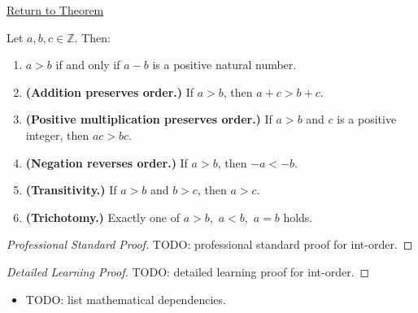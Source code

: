 \newpage
{}
\label{prf:int-order}

\begin{remark*}[Return]
\hyperref[lem:int-order]{Return to Theorem}
\end{remark*}

\begin{lemma*}
Let $a, b, c \in \mathbb{Z}$. Then:
\begin{enumerate}
  \item[(a)] $a > b$ if and only if $a - b$ is a positive natural number.
  \item[(b)] \textbf{(Addition preserves order.)} If $a > b$, then $a + c > b + c$.
  \item[(c)] \textbf{(Positive multiplication preserves order.)}
    If $a > b$ and $c$ is a positive integer, then $ac > bc$.
  \item[(d)] \textbf{(Negation reverses order.)} If $a > b$, then $-a < -b$.
  \item[(e)] \textbf{(Transitivity.)} If $a > b$ and $b > c$, then $a > c$.
  \item[(f)] \textbf{(Trichotomy.)} Exactly one of $a > b$,\ $a < b$,\ $a = b$ holds.
\end{enumerate}
\end{lemma*}

\begin{proof}[Professional Standard Proof]
\LRAProofBodyStart
TODO: professional standard proof for int-order.
\end{proof}

\begin{proof}[Detailed Learning Proof]
\LRAProofBodyStart
TODO: detailed learning proof for int-order.
\end{proof}

\begin{remark*}
\end{remark*}

\begin{dependencies}
\begin{itemize}
  \item TODO: list mathematical dependencies.
\end{itemize}
\end{dependencies}

\clearpage
